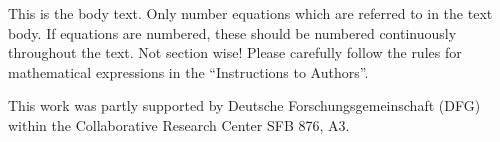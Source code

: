 \documentclass[bimj,fleqn]{w-art}
\theoremstyle{plain}
\theoremstyle{definition}
\begin{document}

\noindent This is the body text. Only number equations which are referred to in the text body. If equations
are numbered, these should be numbered continuously throughout the text. Not section wise! Please
carefully follow the rules for mathematical expressions in the ``Instructions to Authors''.

\begin{acknowledgement}
This work was partly supported by Deutsche Forschungsgemeinschaft (DFG) within the Collaborative Research Center SFB 876, A3.
\end{acknowledgement}
\vspace*{1pc}




\end{document}
